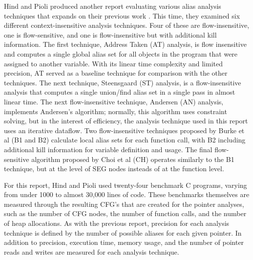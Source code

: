 Hind and Pioli produced another report evaluating various alias analysis techniques that expands on their previous work \cite{Hind}. This time, they examined six different context-insensitive analysis techniques. Four of these are flow-insensitive, one is flow-sensitive, and one is flow-insensitive but with additional kill information. The first technique, Address Taken (AT) analysis, is flow insensitive and computes a single global alias set for all objects in the program that were assigned to another variable. With its linear time complexity and limited precision, AT served as a baseline technique for comparison with the other techniques. The next technique, Steensgaard (ST) analysis, is a flow-insensitive analysis that computes a single union/find alias set in a single pass in almost linear time. The next flow-insensitive technique, Andersen (AN) analysis, implements Andersen's algorithm; normally, this algorithm uses constraint solving, but in the interest of efficiency, the analysis technique used in this report uses an iterative dataflow. Two flow-insensitive techniques proposed by Burke et al (B1 and B2) calculate local alias sets for each function call, with B2 including additional kill information for variable definition and usage. The final flow-sensitive algorithm proposed by Choi et al (CH) operates similarly to the B1 technique, but at the level of SEG nodes insteads of at the function level.

For this report, Hind and Pioli used twenty-four benchmark C programs, varying from under 1000 to almost 30,000 lines of code. These benchmarks themselves are measured through the resulting CFG's that are created for the pointer analyses, such as the number of CFG nodes, the number of function calls, and the number of heap allocations. As with the previous report, precision for each analysis technique is defined by the number of possible aliases for each given pointer. In addition to precision, execution time, memory usage, and the number of pointer reads and writes are measured for each analysis technique.

